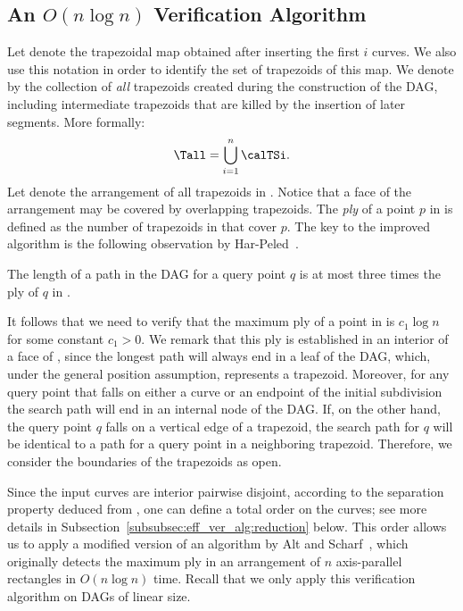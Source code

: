 \subsection{An $O(n\log n)$ Verification Algorithm}
\label{subsec:eff_ver_alg:det}

Let \calTSi denote the trapezoidal map obtained after inserting the
first $i$ curves.
We also use this notation in order to identify
the set of trapezoids of this map.
We denote by \Tall the collection of {\it all} trapezoids created during the
construction of the DAG, including intermediate trapezoids that are
killed by the insertion of later segments.
More formally:
$$\Tall = \bigcup\limits_{i=1}^n \calTSi .$$
Let \Arr{\Tall}
denote the arrangement of all trapezoids in \Tall .
Notice that a face of the arrangement
may be covered by overlapping trapezoids.
The {\it ply} of a point
$p$ in \Arr{\Tall} is defined as the number of
trapezoids in \Tall that cover $p$.
The key to the improved algorithm is the following observation by
Har-Peled~\cite{Har-personal-2012}.
\\

\noindent
\begin{observation} \label{obs:path_len_and_ply_relation}
The length of a path in the DAG for a query point
$q$ is at most three times the ply of $q$ in \Arr{\Tall}.
\end{observation}



It follows that we need to verify that the maximum ply of a point
in \Arr{\Tall} is $c_1 \log n$ for
some constant $c_1 > 0$.
We remark that this ply is established in an
interior of a face of \Arr{\Tall},
since the longest path will always end in a leaf of the DAG,
which, under the general position assumption, represents a trapezoid.
Moreover, for any query point that falls on either a curve or an endpoint
of the initial subdivision
the search path will end in an internal node of the DAG.
If, on the other hand, the query point $q$
falls on a vertical edge of a trapezoid,
the search path for $q$ will be identical to a path
for a query point in a neighboring trapezoid.
Therefore, we consider the boundaries of the trapezoids as open.

Since the input curves are interior
pairwise disjoint,
according to the separation property deduced from \cite{GY-TSR-80},
one can define a total order on the curves;
see more details in Subsection~\ref{subsubsec:eff_ver_alg:reduction} below.
This order allows us to apply a modified version
of an algorithm by Alt and Scharf~\cite{as-cdaaa-13},
which originally detects the
maximum ply in an arrangement of $n$
axis-parallel rectangles in $O(n \log n)$ time.
Recall that we only apply this verification algorithm on DAGs of
linear size.

